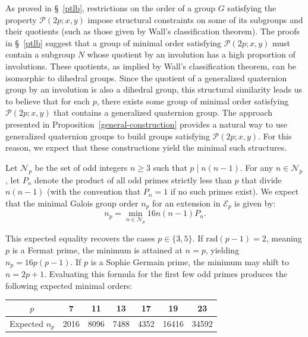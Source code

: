 \documentclass[12pt]{amsart}
\numberwithin{equation}{section}
\theoremstyle{definition}
\theoremstyle{remark}
\begin{document}
As proved in \S~\ref{ptlb}, restrictions on the order of a group $G$ satisfying the property $\mathcal{P}(2p;x,y)$ impose structural constraints on some of its subgroups and their quotients (such as those given by Wall's classification theorem). The proofs in \S~\ref{ptlb} suggest that a group of minimal order satisfying $\mathcal{P}(2p;x,y)$ must contain a subgroup $N$ whose quotient by an involution has a high proportion of involutions. These quotients, as implied by Wall's classification theorem, can be isomorphic to dihedral groups. Since the quotient of a generalized quaternion group by an involution is also a dihedral group, this structural similarity leads us to believe that for each $p$, there exists some group of minimal order satisfying $\mathcal{P}(2p;x,y)$ that contains a generalized quaternion group. The approach presented in Proposition~\ref{general-construction} provides a natural way to use generalized quaternion groups to build groups satisfying $\mathcal{P}(2p; x, y)$. For this reason, we expect that these constructions yield the minimal such structures.

Let $\mathcal{N}_p$ be the set of odd integers $n \ge 3$ such that $p \mid n(n-1)$. For any $n \in \mathcal{N}_p$, let $P_n$ denote the product of all odd primes strictly less than $p$ that divide $n(n-1)$ (with the convention that $P_n = 1$ if no such primes exist). We expect that the minimal Galois group order $n_p$ for an extension in $\mathcal{E}_p$ is given by:
\begin{equation}\label{expectednp}
n_p = \min_{n \in \mathcal{N}_p} 16n(n-1)P_n.
\end{equation}

This expected equality recovers the cases $p\in \{3,5\}$. If $\mathrm{rad}(p-1)=2$, meaning $p$ is a Fermat prime, the minimum is attained at $n=p$, yielding $n_p = 16p(p-1)$. If $p$ is a Sophie Germain prime, the minimum may shift to $n = 2p+1$. Evaluating this formula for the first few odd primes produces the following expected minimal orders:

\begin{table}[h!]
\centering
\begin{tabular}{|c|c|c|c|c|c|c|}
\hline
$p$ & 7 & 11 & 13 & 17 & 19 & 23 \\ \hline
Expected $n_p$ & 2016 & 8096 & 7488 & 4352 & 16416 & 34592 \\ \hline
\end{tabular}
\vspace{0.2cm}
\end{table}
\end{document}
